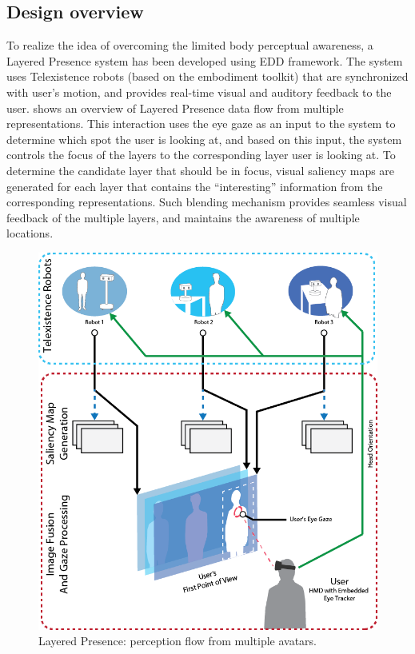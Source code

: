 \subsection{Design overview}


To realize the idea of overcoming the limited body perceptual awareness, a Layered Presence system has been developed using EDD framework. The system uses Telexistence robots (based on the embodiment toolkit) that are synchronized with user’s motion, and provides real-time visual and auditory feedback to the user.  shows an overview of Layered Presence data flow from multiple representations. This interaction uses the eye gaze as an input to the system to determine which spot the user is looking at, and based on this input, the system controls the focus of the layers to the corresponding layer user is looking at. To determine the candidate layer that should be in focus, visual saliency maps are generated for each layer that contains the ``interesting'' information from the corresponding representations. Such blending mechanism provides seamless visual feedback of the multiple layers, and maintains the awareness of multiple locations. 

\begin{figure}[h!]
  \centering
  \includegraphics[width=0.7\linewidth]{figures/eval/Layered/SystemFlow.png}
\captionsetup{justification=centering}
\caption{Layered Presence: perception flow from multiple avatars.}
\label{fig:eval-layered-system} 
\end{figure}

